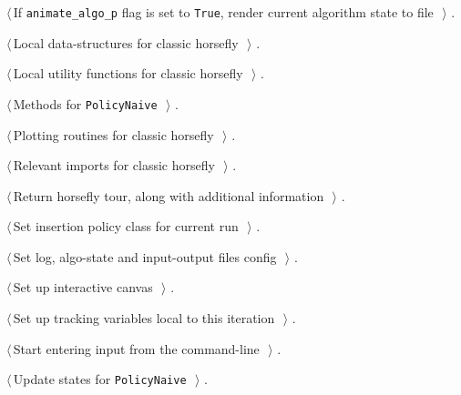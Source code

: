 \documentclass[11.5pt]{report}
\begin{document}
{\begin{list}{}{\setlength{\itemsep}{-\parsep}\setlength{\itemindent}{-\leftmargin}}
\item $\langle\,$If \verb|animate_algo_p| flag is set to \verb|True|, render current algorithm state to file\nobreak\ {\footnotesize {}}$\,\rangle$ {\footnotesize {\NWtxtRefIn} .}
\item $\langle\,$Local data-structures for classic horsefly\nobreak\ {\footnotesize {}}$\,\rangle$ {\footnotesize {\NWtxtRefIn} .}
\item $\langle\,$Local utility functions for classic horsefly\nobreak\ {\footnotesize {}}$\,\rangle$ {\footnotesize {\NWtxtRefIn} .}
\item $\langle\,$Methods for \verb|PolicyNaive|\nobreak\ {\footnotesize {}}$\,\rangle$ {\footnotesize {\NWtxtRefIn} .}
\item $\langle\,$Plotting routines for classic horsefly\nobreak\ {\footnotesize {}}$\,\rangle$ {\footnotesize {\NWtxtRefIn} .}
\item $\langle\,$Relevant imports for classic horsefly\nobreak\ {\footnotesize {}}$\,\rangle$ {\footnotesize {\NWtxtRefIn} .}
\item $\langle\,$Return horsefly tour, along with additional information\nobreak\ {\footnotesize {}}$\,\rangle$ {\footnotesize {\NWtxtRefIn} .}
\item $\langle\,$Set insertion policy class for current run\nobreak\ {\footnotesize {}}$\,\rangle$ {\footnotesize {\NWtxtRefIn} .}
\item $\langle\,$Set log, algo-state and input-output files config\nobreak\ {\footnotesize {}}$\,\rangle$ {\footnotesize {\NWtxtRefIn} .}
\item $\langle\,$Set up interactive canvas\nobreak\ {\footnotesize {}}$\,\rangle$ {\footnotesize {\NWtxtRefIn} .}
\item $\langle\,$Set up tracking variables local to this iteration\nobreak\ {\footnotesize {}}$\,\rangle$ {\footnotesize {\NWtxtRefIn} .}
\item $\langle\,$Start entering input from the command-line\nobreak\ {\footnotesize {}}$\,\rangle$ {\footnotesize {\NWtxtRefIn} .}
\item $\langle\,$Update states for \texttt{PolicyNaive}\nobreak\ {\footnotesize {}}$\,\rangle$ {\footnotesize {\NWtxtRefIn} .}

\end{list}}
\end{document}
